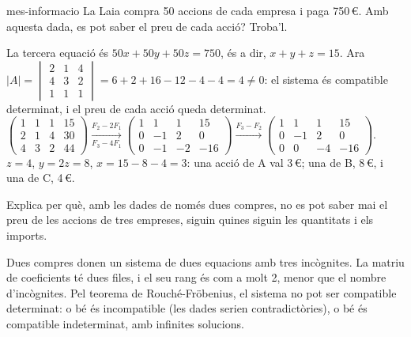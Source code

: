 \begin{apartats}
\begin{tria}{mes-informacio}
La Laia compra 50 accions de cada empresa i paga 750\,€. Amb aquesta dada, es pot saber el preu de cada
acció? Troba'l.

\begin{solucio}
La tercera equació és $50x+50y+50z=750$, és a dir, $x+y+z=15$. Ara
$|A|=\begin{vmatrix}2&1&4\\4&3&2\\1&1&1\end{vmatrix}=6+2+16-12-4-4=4\ne0$: el sistema és compatible
determinat, i el preu de cada acció queda determinat.\\
$\left(\begin{array}{ccc|c}1&1&1&15\\2&1&4&30\\4&3&2&44\end{array}\right)\xrightarrow[F_3-4F_1]{F_2-2F_1}
\left(\begin{array}{ccc|c}1&1&1&15\\0&-1&2&0\\0&-1&-2&-16\end{array}\right)\xrightarrow{F_3-F_2}
\left(\begin{array}{ccc|c}1&1&1&15\\0&-1&2&0\\0&0&-4&-16\end{array}\right)$.\\
$z=4$, $y=2z=8$, $x=15-8-4=3$: una acció de A val 3\,€; una de B, 8\,€, i una de C, 4\,€.
\end{solucio}
\end{tria}

\begin{nomesllarg}
Explica per què, amb les dades de només dues compres, no es pot saber mai el preu de les accions de tres
empreses, siguin quines siguin les quantitats i els imports.

\begin{solucio}
Dues compres donen un sistema de dues equacions amb tres incògnites. La matriu de coeficients té dues
files, i el seu rang és com a molt 2, menor que el nombre d'incògnites. Pel teorema de
Rouché-Fröbenius, el sistema no pot ser compatible determinat: o bé és incompatible (les dades serien
contradictòries), o bé és compatible indeterminat, amb infinites solucions.
\end{solucio}
\end{nomesllarg}

\end{apartats}
